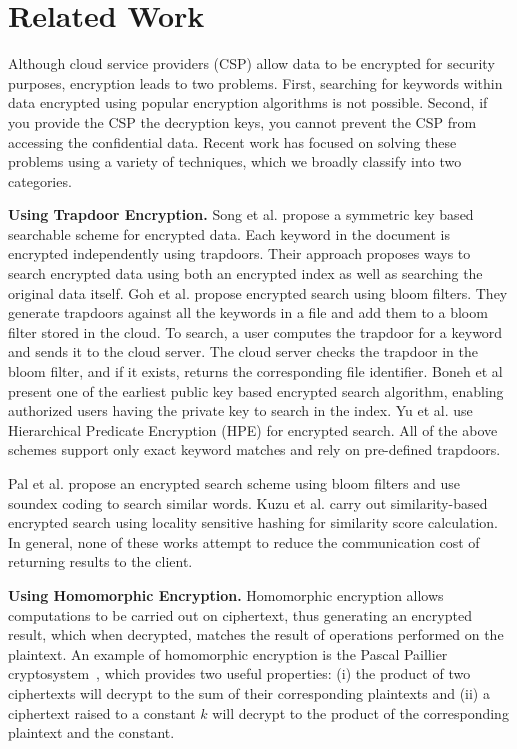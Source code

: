 \section{Related Work}
\label{sec:related}

Although cloud service providers (CSP) allow data to be encrypted for security
purposes, encryption leads to two problems. First, searching for 
keywords within data encrypted using popular encryption algorithms is not
possible. Second, if you provide the CSP the decryption keys, 
you cannot prevent the CSP from accessing the confidential 
data.
Recent work has focused on solving these problems using a variety of techniques,
which we broadly classify into two categories.

\textbf{Using Trapdoor Encryption.}
Song et al. \cite{song} propose a symmetric key based
searchable scheme for encrypted data. Each keyword in the document is encrypted independently
using trapdoors. Their approach proposes ways to search encrypted data using 
both an
encrypted index as well as searching the original data itself. 
Goh et al.\cite{goh2003secure} propose encrypted search using bloom filters. They generate trapdoors
against all the keywords in a file and add them to a bloom filter stored
in the cloud. 
To search, a user computes the trapdoor for a keyword and sends it to the cloud
server. The cloud server checks the trapdoor in the bloom filter, and if
it exists, returns the corresponding file identifier. 
Boneh et al \cite{boneh}
present one of the earliest public key based encrypted search algorithm, 
enabling 
authorized users having 
the private key to search in the index. 
Yu et al. \cite{li} use
Hierarchical Predicate Encryption (HPE) for encrypted search. 
All of the above schemes support only
exact keyword matches and rely on pre-defined trapdoors.

Pal et al. \cite{saibal} propose an encrypted search scheme using bloom filters
and use soundex coding\cite{odell1918soundex} to search similar words. Kuzu et al.\cite{mehmat} carry out similarity-based encrypted search 
using locality sensitive hashing for similarity score calculation. 
In general, none of these works attempt to reduce the communication cost of 
returning results to the client.


\textbf{Using Homomorphic Encryption.}
Homomorphic encryption
allows computations to be carried out on ciphertext, thus generating an 
encrypted result, which when decrypted, matches the result of operations performed 
on the plaintext. An example of homomorphic encryption is the Pascal Paillier 
cryptosystem~\cite{pascal}, which provides two useful properties: 
(i) the product of two ciphertexts will decrypt to the sum of their corresponding plaintexts
and (ii) a ciphertext raised to a constant $k$ will decrypt to the product of the 
corresponding plaintext and the constant.

